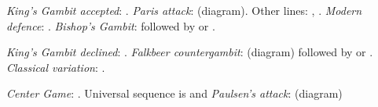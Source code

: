 \hspace{5mm}
\begin{minipage}[t]{.175\linewidth}
\raggedright
\begin{center}
\scalebox{.560}{\showboard}
\end{center}
\newgame
\emph{King's Gambit accepted}: .
\emph{Paris attack}:  (diagram).
Other lines: , .
\emph{Modern defence}: .
\emph{Bishop's Gambit}:  followed by  or .
\vspace{2mm}
\end{minipage}
\newline
\begin{minipage}[t]{.175\linewidth}
\raggedright
\begin{center}
\scalebox{.560}{\showboard}
\end{center}
\newgame
\emph{King's Gambit declined}: .
\emph{Falkbeer countergambit}:  (diagram) followed by  or .
\emph{Classical variation}: .
\vspace{2mm}
\end{minipage}
\hspace{5mm}
\begin{minipage}[t]{.175\linewidth}
\raggedright
\begin{center}
\scalebox{.560}{\showboard}
\end{center}
\newgame
\emph{Center Game}: .
Universal sequence is  and \emph{Paulsen's attack}:  (diagram)
\vspace{2mm}
\end{minipage}
